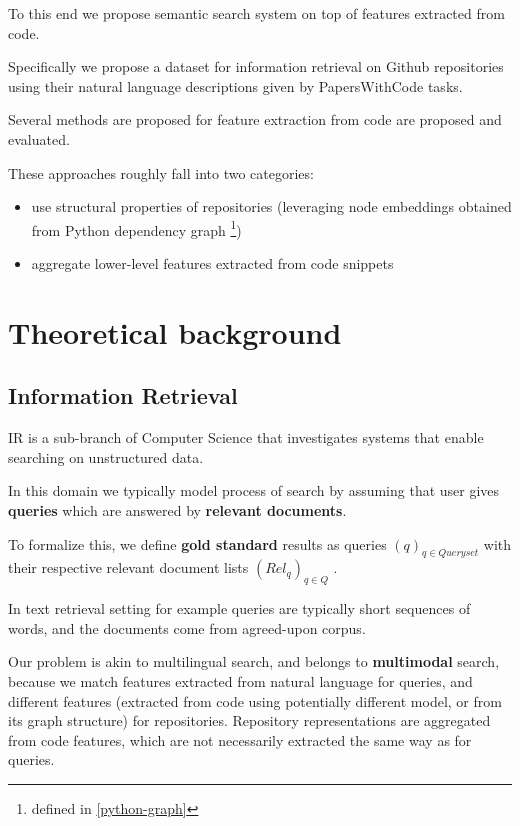 \documentclass[11pt]{report}
\begin{document}
To this end we propose semantic search system on top of features extracted from code.

Specifically we propose a dataset for information retrieval on Github repositories using their natural language descriptions given by PapersWithCode tasks.

Several methods are proposed for feature extraction from code are proposed and evaluated.

These approaches roughly fall into two categories:
\begin{itemize}
\item use structural properties of repositories (leveraging node embeddings obtained from Python dependency graph \footnote{defined in \ref{python-graph}})
\item aggregate lower-level features extracted from code snippets
\end{itemize}


\chapter{Theoretical background}


\section{Information Retrieval}


IR is a sub-branch of Computer Science that investigates systems that enable searching on unstructured data.

In this domain we typically model process of search by assuming that user gives \textbf{\textbf{queries}} which are answered by \textbf{\textbf{relevant documents}}.

To formalize this, we define \textbf{gold standard} results as queries \((q)_{q \in Queryset}\) with their respective relevant document lists \((Rel_q)_{q \in Q}\) .

In text retrieval setting for example queries are typically short sequences of words, and the documents come from agreed-upon corpus.

Our problem is akin to multilingual search, and belongs to \textbf{multimodal} search, because we match features extracted from natural language for queries, and different features (extracted from code using potentially different model, or from its graph structure) for repositories. Repository representations are aggregated from code features, which are not necessarily extracted the same way as for queries.
\end{document}
